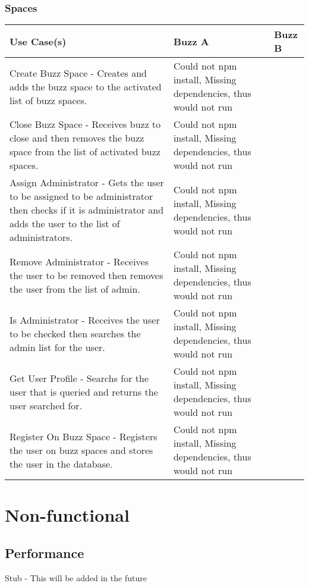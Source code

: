 \documentclass[12pt]{article}
\begin{document}
\subsubsection{Spaces}%
\begin{tabular}{|p{4.5cm}|p{4.5cm}|p{4.5cm}|}

\hline
Use Case(s) & Buzz A & Buzz B \\ 
\hline
Create Buzz Space - Creates and adds the buzz space to the activated list of buzz spaces. & Could not npm install, Missing dependencies, thus would not run &  \\ %
\hline
Close Buzz Space - Receives buzz to close and then removes the buzz space from the list of activated buzz spaces. & Could not npm install, Missing dependencies, thus would not run & \\ %
\hline
Assign Administrator - Gets the user to be assigned to be administrator then checks if it is administrator and adds the user to the list of administrators.  & Could not npm install, Missing dependencies, thus would not run & \\ %
\hline
Remove Administrator - Receives the user to be removed then removes the user from the list of admin. & Could not npm install, Missing dependencies, thus would not run &  \\ %
\hline
Is Administrator - Receives the user to be checked then searches the admin list for the user.  & Could not npm install, Missing dependencies, thus would not run &  \\ %
\hline
Get User Profile -  Searchs for the user that is queried and returns the user searched for. & Could not npm install, Missing dependencies, thus would not run &  \\ %
\hline
Register On Buzz Space - Registers the user on buzz spaces and stores the user in the database. & Could not npm install, Missing dependencies, thus would not run &  \\ %
\hline

\end{tabular}


\section{Non-functional} %
\subsection{Performance}
Stub - This will be added in the future
\end{document}
